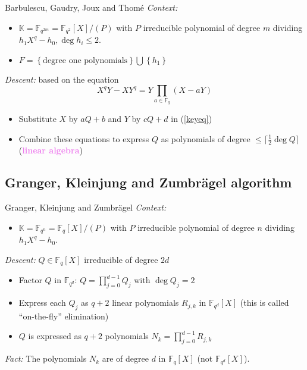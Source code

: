 \documentclass[xcolor=x11names,compress]{beamer}
\theoremstyle{break}
\theoremstyle{sc}
\theoremstyle{definition}
\theoremstyle{remark}
\begin{document}
\begin{frame}{Barbulescu, Gaudry, Joux and Thomé}
  \emph{Context:}
  \begin{itemize}
    \item $\mathbb{K}=\mathbb{F}_{q^{2m}}=\mathbb{F}_{q^2}[X]/(P)$ with $P$ irreducible
      polynomial of degree $m$ dividing $h_1X^q-h_0, \deg h_i\leq 2$.
    \item $F=\left\{  \text{degree one polynomials}\right\}\bigcup\left\{ h_1
      \right\}$ 
\end{itemize}
\emph{Descent:} based on the equation
 \begin{equation}
   X^qY - XY^q = Y\prod_{a\in\mathbb{F}_q}(X - aY)
   \label{keyeq}
 \end{equation}

  \begin{itemize}
   \item Substitute $X$ by $aQ + b$ and $Y$ by $cQ + d$ in (\ref{keyeq})
   \item Combine these equations to express $Q$ as polynomials of degree $\leq
     \lceil\frac{1}{2}\deg Q\rceil$ (\textcolor{violet}{\textbf{linear
     algebra}})
\end{itemize}
\end{frame}

\subsection{Granger, Kleinjung and Zumbrägel algorithm}

\begin{frame}{Granger, Kleinjung and Zumbrägel}
  \emph{Context:}
  \begin{itemize}
    \item $\mathbb{K}=\mathbb{F}_{q^n} = \mathbb{F}_q[X]/(P)$ with
  $P$ irreducible polynomial of degree $n$ dividing $h_1X^q-h_0$.
  \end{itemize}
  \emph{Descent:} $Q\in\mathbb{F}_q[X]$ irreducible of degree $2d$
  \begin{itemize}
    \item Factor $Q$ in $\mathbb{F}_{q^d}$: $Q=\prod_{j=0}^{d-1} Q_j$ with $\deg
      Q_j=2$
    \item Express each $Q_j$ as $q+2$ linear polynomials $R_{j,k}$ in
      $\mathbb{F}_{q^d}[X]$ (this is called ``on-the-fly'' elimination)
    \item $Q$ is expressed as $q+2$ polynomials $N_k = \prod_{j=0}^{d-1}R_{j,k}$
  \end{itemize}
  \emph{Fact:} The polynomials $N_k$ are of degree $d$ in $\mathbb{F}_{q}[X]$
  (not $\mathbb{F}_{q^d}[X]$).
\end{frame}
\end{document}

